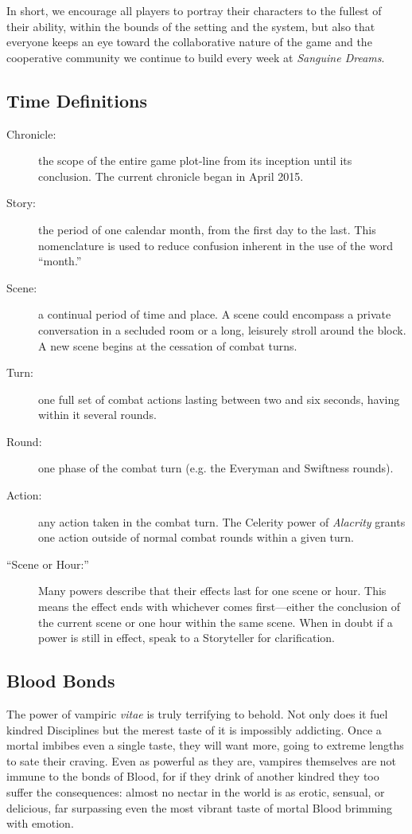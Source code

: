In short, we encourage all players to portray their characters to the fullest of their ability, within the bounds 
of the setting and the system, but also that everyone keeps an eye toward the collaborative nature of the game and the 
cooperative community we continue to build every week at \emph{Sanguine Dreams}.

\subsection{Time Definitions}
\begin{description}
	\item[Chronicle:]  the scope of the entire game plot-line from its inception until its 
	conclusion.  The current chronicle began in April 2015.
	\item[Story:]  the period of one calendar month, from the first day to the last.  This 
	nomenclature is used to reduce confusion inherent in the use of the word ``month.''
	\item[Scene:]  a continual period of time and place.  A scene could encompass a 
	private conversation in a secluded room or a long, leisurely stroll around the 
	block.  A new scene begins at the cessation of combat turns.
	\item[Turn:]  one full set of combat actions lasting between two and six seconds, 
	having within it several rounds.
	\item[Round:]  one phase of the combat turn (e.g. the Everyman and Swiftness 
	rounds).
	\item[Action:]  any action taken in the combat turn.  The Celerity power of \emph{Alacrity} 
	grants one action outside of normal combat rounds within a given turn.
	\item[``Scene or Hour:''] Many powers describe that their effects last for one scene or hour.  
	This means the effect ends with whichever comes first---either the conclusion of the current 
	scene or one hour within the same scene.  When in doubt if a power is still in effect, speak 
	to a Storyteller for clarification.
\end{description}
	
\subsection{Blood Bonds}
The power of vampiric \emph{vitae} is truly terrifying to behold.  Not only does it 
fuel kindred Disciplines but the merest taste of it is impossibly addicting.  Once 
a mortal imbibes even a single taste, they will want more, going to extreme lengths 
to sate their craving.  Even as powerful as they are, vampires themselves are not 
immune to the bonds of Blood, for if they drink of another kindred they too suffer 
the consequences:  almost no nectar in the world is as erotic, sensual, or delicious, 
far surpassing even the most vibrant taste of mortal Blood brimming with emotion.

